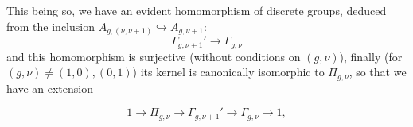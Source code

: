 This being so, we have an evident homomorphism of discrete groups, deduced from the inclusion  $A_{g,(\nu,\nu+1)}\hookrightarrow A_{g,\nu+1}$:
\[
\tag{42}
\Gamma_{g,\nu+1}'\longrightarrow\Gamma_{g,\nu}
\]
and this homomorphism is surjective (without conditions on $(g,\nu)$), finally (for $(g,\nu)\ne(1,0),(0,1)$) its kernel is canonically isomorphic to $\Pi_{g,\nu}$, so that we have an extension


\[
\tag{43}
1\longrightarrow\Pi_{g,\nu}\longrightarrow\Gamma_{g,\nu+1}'
\longrightarrow\Gamma_{g,\nu}\longrightarrow1,
\]
